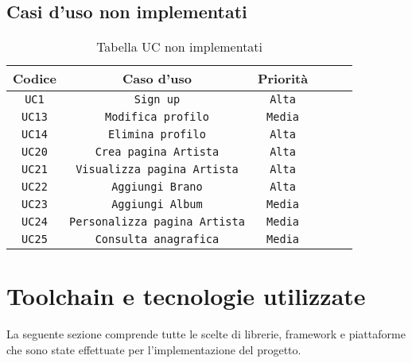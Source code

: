 \newpage
\subsection{Casi d'uso non implementati} 
\begin{table} [h!]
    \begin{center}
        \begin{tabular}{ |Sc|Sc|Sc| } 
         \hline
         Codice & Caso d'uso & Priorità \\ 
         \hline
         \hline
         \texttt{UC1} & \texttt{Sign up} & \texttt{Alta} \\ 
         \hline
         \texttt{UC13} & \texttt{Modifica profilo} & \texttt{Media} \\ 
         \hline
         \texttt{UC14} & \texttt{Elimina profilo} & \texttt{Alta} \\ 
         \hline
         \texttt{UC20} & \texttt{Crea pagina Artista} & \texttt{Alta} \\ 
         \hline
         \texttt{UC21} & \texttt{Visualizza pagina Artista} & \texttt{Alta} \\ 
         \hline
         \texttt{UC22} & \texttt{Aggiungi Brano} & \texttt{Alta} \\ 
         \hline
         \texttt{UC23} & \texttt{Aggiungi Album} & \texttt{Media} \\ 
         \hline
         \texttt{UC24} & \texttt{Personalizza pagina Artista} & \texttt{Media} \\ 
         \hline
         \texttt{UC25} & \texttt{Consulta anagrafica} & \texttt{Media} \\ 
         \hline
         \end{tabular}
    \end{center}
    \caption{Tabella UC non implementati}
\end{table}

\newpage
\section{Toolchain e tecnologie utilizzate}
La seguente sezione comprende tutte le scelte di librerie, framework e piattaforme
che sono state effettuate per l'implementazione del progetto.


